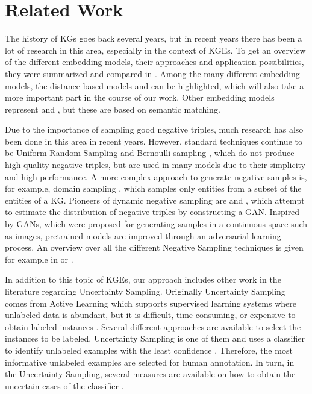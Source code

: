 \section{Related Work} 
\label{sec:relatedwork}


The history of \acp{KG} goes back several years, but in recent years there has been a lot of research in this area, especially in the context of \acp{KGE}.  
To get an overview of the different embedding models, their approaches and application possibilities, they were summarized and compared in \cite{electronics9050750}.
Among the many different embedding models, the distance-based models \transe \cite{TransE} and \transd   \cite{TransD}can be highlighted, which will also take a more important part in the course of our work.
Other embedding models represent \distmult \cite{DistMult} and \complex \cite{ComplEx}, but these are based on semantic matching. 

Due to the importance of sampling good negative triples, much research has also been done in this area in recent years.
However, standard techniques continue to be Uniform Random Sampling \cite{TransE} and Bernoulli sampling \cite{TransH}, which do not produce high quality negative triples, but are used in many models due to their simplicity and high performance.  
A more complex approach to generate negative samples is, for example, domain sampling \cite{domainSampling}, which samples only entities from a subset of the entities of a \ac{KG}.
Pioneers of dynamic negative sampling are \kbgan \cite{cai2017kbgan} and \igan \cite{IGAN}, which attempt to estimate the distribution of negative triples by constructing a \ac{GAN}.
Inspired by \acp{GAN}, which were proposed for generating samples in a continuous space such as images, pretrained models are improved through an adversarial learning process.
An overview over all the different Negative Sampling techniques is given for example in \cite{qiannegative} or \cite{MCNS}.

In addition to this topic of \acp{KGE}, our approach includes other work in the literature regarding Uncertainty Sampling.
Originally Uncertainty Sampling comes from Active Learning which supports supervised learning systems where unlabeled data is abundant, but it is difficult, time-consuming, or expensive to obtain labeled instances \cite{Settles2009ActiveLL}.
Several different approaches are available to select the instances to be labeled.
Uncertainty Sampling is one of them and uses a classifier to identify unlabeled examples with the least confidence \cite{5272205}.
Therefore, the most informative unlabeled examples are selected for human annotation.
In turn, in the Uncertainty Sampling, several measures are available on how to obtain the uncertain cases of the classifier \cite{nguyen2021howtomeasure}.

